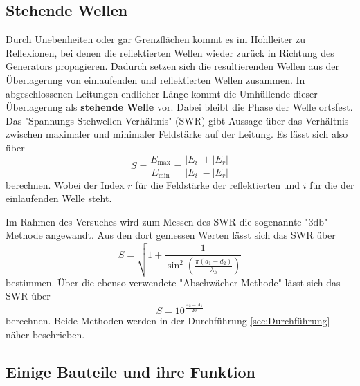 \subsection{Stehende Wellen}

Durch Unebenheiten oder gar Grenzflächen kommt es im Hohlleiter zu Reflexionen, bei denen die reflektierten Wellen wieder zurück in Richtung des Generators propagieren. Dadurch setzen sich die resultierenden Wellen aus der Überlagerung von einlaufenden und reflektierten Wellen zusammen. In abgeschlossenen Leitungen endlicher Länge kommt die Umhüllende dieser Überlagerung als \textbf{stehende Welle} vor. Dabei bleibt die Phase der Welle ortsfest. Das "Spannungs-Stehwellen-Verhältnis" (SWR) gibt Aussage über das Verhältnis zwischen maximaler und minimaler Feldstärke auf der Leitung. Es lässt sich also über
\begin{equation}
    S = \frac{E_{\text{max}}}{E_{\text{min}}} = \frac{|E_i|+|E_r|}{|E_i|-|E_r|}
\end{equation}
berechnen. Wobei der Index $r$ für die Feldstärke der reflektierten und $i$ für die der einlaufenden Welle steht.


Im Rahmen des Versuches wird zum Messen des SWR die sogenannte "$3 \si{\decibel}$"- Methode angewandt. Aus den dort gemessen Werten lässt sich das SWR über
\begin{equation}
    \label{eqn:3db}
    S = \sqrt{1+\frac{1}{\sin^2\left(\frac{\pi(d_1-d_2)}{\lambda_h}\right)}}
\end{equation}
bestimmen. 
Über die ebenso verwendete "Abschwächer-Methode" lässt sich das SWR über
\begin{equation}
    \label{eqn:abschw}
    S = 10^{\frac{A_2-A_1}{20}}
\end{equation}
berechnen.
Beide Methoden werden in der Durchführung \ref{sec:Durchführung} näher beschrieben.


\subsection{Einige Bauteile und ihre Funktion}


